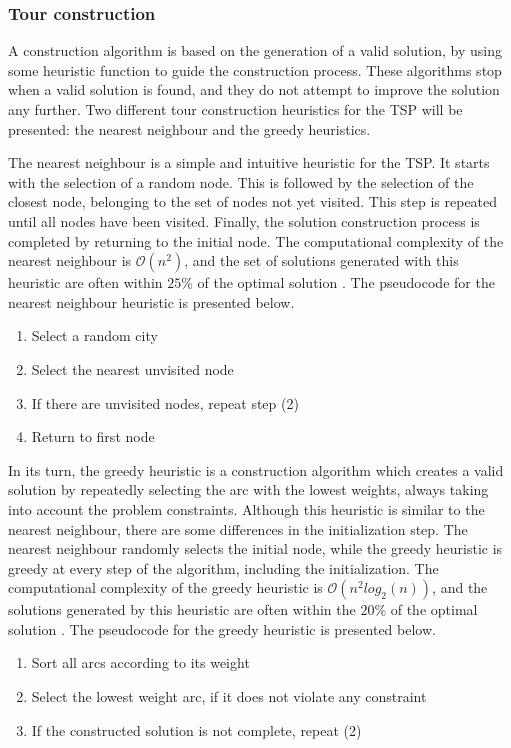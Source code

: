 \subsubsection{Tour construction}

A construction algorithm is based on the generation of a valid solution, by using some heuristic function to guide the construction process. These algorithms stop when a valid solution is found, and they do not attempt to improve the solution any further. Two different tour construction heuristics for the TSP will be presented: the nearest neighbour and the greedy heuristics.

The nearest neighbour \cite{local_search_book} is a simple and intuitive heuristic for the TSP. It starts with the selection of a random node. This is followed by the selection of the closest node, belonging to the set of nodes not yet visited. This step is repeated until all nodes have been visited. Finally, the solution construction process is completed by returning to the initial node. The computational complexity of the nearest neighbour is $\mathcal{O}(n^2)$, and the set of solutions generated with this heuristic are often within $25\%$ of the optimal solution \cite{heuristics_tsp}. The pseudocode for the nearest neighbour heuristic is presented below.

\begin{enumerate}
  \item Select a random city
  \item Select the nearest unvisited node
  \item If there are unvisited nodes, repeat step (2)
  \item Return to first node
\end{enumerate}

In its turn, the greedy heuristic \cite{local_search_book} is a construction algorithm which creates a valid solution by repeatedly selecting the arc with the lowest weights, always taking into account the problem constraints. Although this heuristic is similar to the nearest neighbour, there are some differences in the initialization step. The nearest neighbour randomly selects the initial node, while the greedy heuristic is greedy at every step of the algorithm, including the initialization. The computational complexity of the greedy heuristic is $\mathcal{O}(n^2log_2(n))$, and the solutions generated by this heuristic are often within the $20\%$ of the optimal solution \cite{heuristics_tsp}. The pseudocode for the greedy heuristic is presented below. 

\begin{enumerate}
  \item Sort all arcs according to its weight
  \item Select the lowest weight arc, if it does not violate any constraint
  \item If the constructed solution is not complete, repeat (2)
\end{enumerate}
